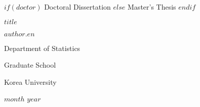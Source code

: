 \documentclass[$fontsize$]{report}
\begin{document}
\newpage
\begin{center}
\noindent
{\fontsize{16pt}{16pt}\selectfont
$if(doctor)$
Doctoral Dissertation
$else$
Master's Thesis
$endif$\par}
\vspace{3cm} %
\doublespacing
{\fontsize{21pt}{21pt}\selectfont $title$ \par}
\par\vfill %
\onehalfspacing
{\fontsize{16pt}{16pt}\selectfont $author.en$ \par}
\vspace{0.5cm}
{\fontsize{16pt}{16pt}\selectfont Department of Statistics \par}
\vspace{1.5cm}
{\fontsize{18pt}{18pt}\selectfont Graduate School \par}
\vspace{0.5cm}
{\fontsize{18pt}{18pt}\selectfont Korea University \par}
\vspace{1cm}
{\fontsize{14pt}{14pt}\selectfont $month$ $year$} %
\end{center}
\end{document}
